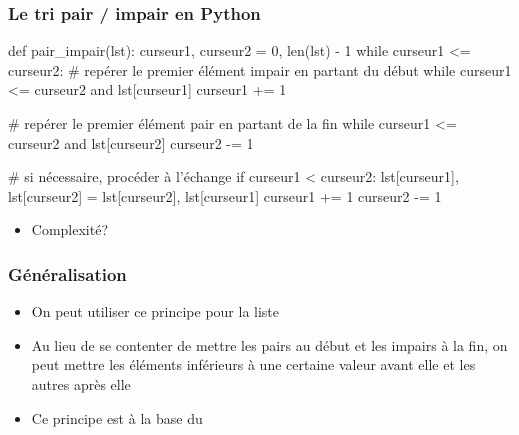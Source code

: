 \documentclass[12pt]{linfo-beamer}
\begin{document}

\begin{frame}[fragile]
    \frametitle{Le tri pair / impair en Python}

{
\scriptsize
\begin{pyframe}{}
def pair_impair(lst):
    curseur1, curseur2 = 0, len(lst) - 1
    while curseur1 <= curseur2:
        # repérer le premier élément impair en partant du début
        while curseur1 <= curseur2 and lst[curseur1] %
            curseur1 += 1

        # repérer le premier élément pair en partant de la fin
        while curseur1 <= curseur2 and lst[curseur2] %
            curseur2 -= 1

        # si nécessaire, procéder à l'échange
        if curseur1 < curseur2:
            lst[curseur1], lst[curseur2] = lst[curseur2], lst[curseur1]
            curseur1 += 1
            curseur2 -= 1
\end{pyframe}
}
\begin{itemize}
\item Complexité?  \pause {}
\end{itemize}

\end{frame}


\begin{frame}
    \frametitle{Généralisation}
\begin{itemize}
    \item On peut utiliser ce principe pour  la liste
    \item Au lieu de se contenter de mettre les pairs au début et les
      impairs à la fin, on peut mettre les éléments inférieurs à une
      certaine valeur avant elle et les autres après elle
    \item Ce principe est à la base du 
\end{itemize}
\end{frame}

\end{document}
